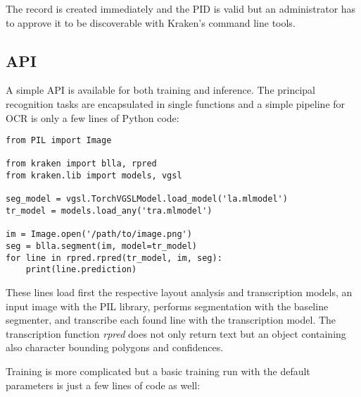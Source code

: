 The record is created immediately and the PID is valid but an administrator has
to approve it to be discoverable with Kraken's command line tools.

\subsection{API}

A simple API is available for both training and inference. The principal
recognition tasks are encapsulated in single functions and a simple pipeline
for OCR is only a few lines of Python code:

\begin{verbatim}
from PIL import Image

from kraken import blla, rpred
from kraken.lib import models, vgsl

seg_model = vgsl.TorchVGSLModel.load_model('la.mlmodel')
tr_model = models.load_any('tra.mlmodel')

im = Image.open('/path/to/image.png')
seg = blla.segment(im, model=tr_model)
for line in rpred.rpred(tr_model, im, seg):
    print(line.prediction)
\end{verbatim}

These lines load first the respective layout analysis and transcription models,
an input image with the PIL library, performs segmentation with the baseline
segmenter, and transcribe each found line with the transcription model. The
transcription function \emph{rpred} does not only return text but an object
containing also character bounding polygons and confidences.

Training is more complicated but a basic training run with the default
parameters is just a few lines of code as well:

